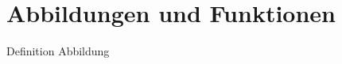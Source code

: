 \documentclass[main.tex]{subfiles}
\begin{document}
\section*{Abbildungen und Funktionen}
\begin{karte}{Definition Abbildung}
    
\end{karte}
\end{document}
